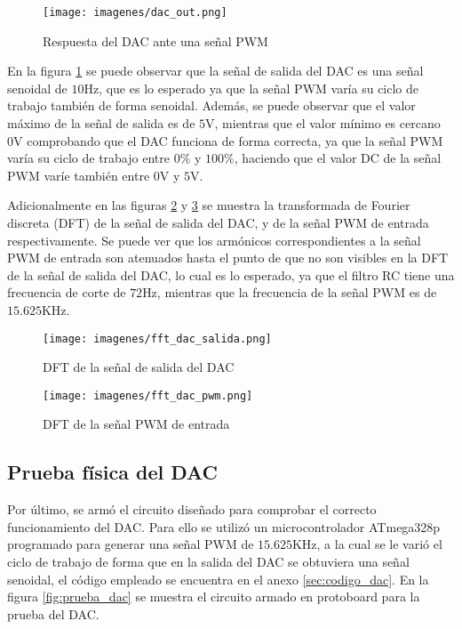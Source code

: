     \begin{figure}[H]
        \centering
        \texttt{[image: imagenes/dac\_out.png]}
        \caption{Respuesta del DAC ante una señal PWM}
        \label{fig:sim_dac}
    \end{figure}

    En la figura \ref{fig:sim_dac} se puede observar que la señal de salida
    del DAC es una señal senoidal de $10\text{Hz}$, que es lo esperado ya 
    que la señal PWM varía su ciclo de trabajo también de forma senoidal.
    Además, se puede observar que el valor máximo de la señal de salida es
    de $5\text{V}$, mientras que el valor mínimo es cercano $0\text{V}$
    comprobando que el DAC funciona de forma correcta, ya que la señal PWM
    varía su ciclo de trabajo entre $0\%$ y $100\%$, haciendo que el valor 
    DC de la señal PWM varíe también entre $0\text{V}$ y $5\text{V}$.

    Adicionalmente en las figuras \ref{fig:sim_dac_fft} y \ref{fig:sim_dac_fft_in}
    se muestra la transformada de Fourier discreta (DFT) de la señal de salida
    del DAC, y de la señal PWM de entrada respectivamente. Se puede ver 
    que los armónicos correspondientes a la señal PWM de entrada son atenuados
    hasta el punto de que no son visibles en la DFT de la señal de salida del
    DAC, lo cual es lo esperado, ya que el filtro RC tiene una frecuencia de corte
    de $72\text{Hz}$, mientras que la frecuencia de la señal PWM es de 
    $15.625\text{KHz}$.

    \begin{figure}[H]
        \centering
        \texttt{[image: imagenes/fft\_dac\_salida.png]}
        \caption{DFT de la señal de salida del DAC}
        \label{fig:sim_dac_fft}
    \end{figure}

    \begin{figure}[H]
        \centering
        \texttt{[image: imagenes/fft\_dac\_pwm.png]}
        \caption{DFT de la señal PWM de entrada}
        \label{fig:sim_dac_fft_in}
    \end{figure}


    \subsection{Prueba física del DAC}

    Por último, se armó el circuito diseñado para comprobar
    el correcto funcionamiento del DAC. Para ello se utilizó un microcontrolador
    ATmega328p programado para generar una señal PWM de $15.625\text{KHz}$,
    a la cual se le varió el ciclo de trabajo de forma que en la salida del DAC
    se obtuviera una señal senoidal, el código empleado se encuentra en
    el anexo \ref{sec:codigo_dac}. En la figura \ref{fig:prueba_dac} se muestra
    el circuito armado en protoboard para la prueba del DAC.




